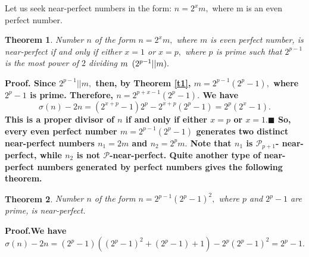 \documentclass[12pt]{amsart}
\newtheorem{theorem}{Theorem}
\numberwithin{equation}{section}
\begin{document}
  Let us seek near-perfect numbers in the form: $n=2^x m,$ where m is an even perfect number.
  \begin{theorem} \label{t4}
Number $n$ of the form $n=2^x m,$ where $m$ is even perfect number, is near-perfect if and only if either $x=1$ or $x=p,$ where $p$ is prime such that $2^{p-1}$ is the most power of $2$ dividing $m \enskip (2^{p-1}||m).$
\end{theorem}
 \bfseries Proof. \mdseries Since $2^{p-1}||m,$ then, by Theorem \ref{t1}, $m=2^{p-1}(2^p-1),$ where $2^p-1$ is prime.
 Therefore, $n=2^{p+x-1}(2^p-1).$ We have
 $$\sigma(n)-2n=(2^{x+p}-1)2^p-2^{x+p}(2^p-1)=2^p(2^x-1).$$
 This is a proper divisor of $n$ if and only if either $x=p$ or $x=1.\blacksquare$ \newline
  So, every even perfect number $m=2^{p-1}(2^p-1)$ generates two distinct near-perfect numbers $n_1=2m$ and $n_2=2^pm.$ Note that $n_1$ is $\mathcal{P}_{p+1}$- near-perfect, while $n_2$ is not $\mathcal{P}$-near-perfect.\newline
  \indent Quite another type of near-perfect numbers generated by perfect numbers gives the following theorem.
  \begin{theorem} \label{t5}
Number $n$ of the form $n=2^{p-1}(2^p-1)^2,$ where $p$ and $2^p-1$ are prime, is near-perfect.
\end{theorem}
\bfseries Proof.\mdseries We have
$$\sigma(n)-2n=(2^p-1)((2^p-1)^2+(2^p-1)+1)-2^p(2^p-1)^2=2^p-1.$$
\end{document}
